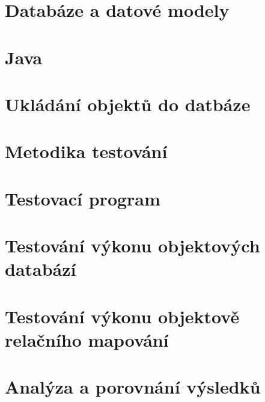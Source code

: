 \chapter{Databáze a datové modely}


\chapter{Java}


\chapter{Ukládání objektů do datbáze}


\chapter{Metodika testování}


\chapter{Testovací program}


\chapter{Testování výkonu objektových databází}


\chapter{Testování výkonu objektově relačního mapování }


\chapter{Analýza a porovnání výsledků}

